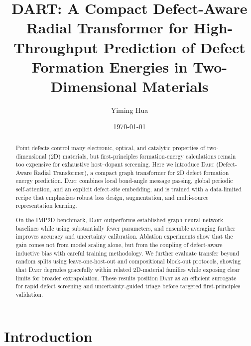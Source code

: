\documentclass[twocolumn,superscriptaddress,prb,floatfix]{revtex4-2}
\newcommand{\dart}{\textsc{Dart}}
\begin{document}
\title{DART: A Compact Defect-Aware Radial Transformer for High-Throughput Prediction of Defect Formation Energies in Two-Dimensional Materials}

\author{Yiming Hua}

\date{\today}

\begin{abstract}
Point defects control many electronic, optical, and catalytic properties
of two-dimensional (2D) materials, but first-principles formation-energy
calculations remain too expensive for exhaustive host--dopant screening.
Here we introduce \dart{} (Defect-Aware Radial Transformer), a compact
graph transformer for 2D defect formation energy prediction. \dart{}
combines local bond-angle message passing, global periodic self-attention,
and an explicit defect-site embedding, and is trained with a data-limited
recipe that emphasizes robust loss design, augmentation, and multi-source
representation learning.

On the IMP2D benchmark, \dart{} outperforms established graph-neural-network
baselines while using substantially fewer parameters, and ensemble averaging
further improves accuracy and uncertainty calibration. Ablation experiments
show that the gain comes not from model scaling alone, but from the coupling
of defect-aware inductive bias with careful training methodology. We further
evaluate transfer beyond random splits using leave-one-host-out and
compositional block-out protocols, showing that \dart{} degrades gracefully
within related 2D-material families while exposing clear limits for broader
extrapolation. These results position \dart{} as an efficient surrogate for
rapid defect screening and uncertainty-guided triage before targeted
first-principles validation.
\end{abstract}

\maketitle

\section{Introduction}\label{sec:intro}


\end{document}
